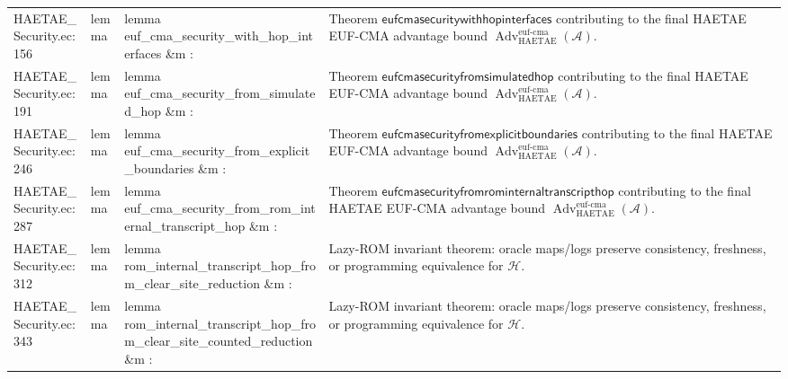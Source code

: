 \documentclass[10pt]{article}
\newcommand{\Adv}{\operatorname{Adv}}
\begin{document}
\begin{longtable}{L{0.11\textwidth}L{0.055\textwidth}L{0.385\textwidth}L{0.41\textwidth}}
HAETAE\_\allowbreak{}Security.\allowbreak{}ec:\allowbreak{}156 & lemma & {\ttfamily\scriptsize lemma euf\_\allowbreak{}cma\_\allowbreak{}security\_\allowbreak{}with\_\allowbreak{}hop\_\allowbreak{}interfaces \&m :} & Theorem $\mathsf{eufcmasecuritywithhopinterfaces}$ contributing to the final HAETAE EUF-CMA advantage bound $\Adv_{\mathrm{HAETAE}}^{\mathrm{euf\mbox{-}cma}}(\mathcal A)$. \\
HAETAE\_\allowbreak{}Security.\allowbreak{}ec:\allowbreak{}191 & lemma & {\ttfamily\scriptsize lemma euf\_\allowbreak{}cma\_\allowbreak{}security\_\allowbreak{}from\_\allowbreak{}simulated\_\allowbreak{}hop \&m :} & Theorem $\mathsf{eufcmasecurityfromsimulatedhop}$ contributing to the final HAETAE EUF-CMA advantage bound $\Adv_{\mathrm{HAETAE}}^{\mathrm{euf\mbox{-}cma}}(\mathcal A)$. \\
HAETAE\_\allowbreak{}Security.\allowbreak{}ec:\allowbreak{}246 & lemma & {\ttfamily\scriptsize lemma euf\_\allowbreak{}cma\_\allowbreak{}security\_\allowbreak{}from\_\allowbreak{}explicit\_\allowbreak{}boundaries \&m :} & Theorem $\mathsf{eufcmasecurityfromexplicitboundaries}$ contributing to the final HAETAE EUF-CMA advantage bound $\Adv_{\mathrm{HAETAE}}^{\mathrm{euf\mbox{-}cma}}(\mathcal A)$. \\
HAETAE\_\allowbreak{}Security.\allowbreak{}ec:\allowbreak{}287 & lemma & {\ttfamily\scriptsize lemma euf\_\allowbreak{}cma\_\allowbreak{}security\_\allowbreak{}from\_\allowbreak{}rom\_\allowbreak{}internal\_\allowbreak{}transcript\_\allowbreak{}hop \&m :} & Theorem $\mathsf{eufcmasecurityfromrominternaltranscripthop}$ contributing to the final HAETAE EUF-CMA advantage bound $\Adv_{\mathrm{HAETAE}}^{\mathrm{euf\mbox{-}cma}}(\mathcal A)$. \\
HAETAE\_\allowbreak{}Security.\allowbreak{}ec:\allowbreak{}312 & lemma & {\ttfamily\scriptsize lemma rom\_\allowbreak{}internal\_\allowbreak{}transcript\_\allowbreak{}hop\_\allowbreak{}from\_\allowbreak{}clear\_\allowbreak{}site\_\allowbreak{}reduction \&m :} & Lazy-ROM invariant theorem: oracle maps/logs preserve consistency, freshness, or programming equivalence for $\mathcal H$. \\
HAETAE\_\allowbreak{}Security.\allowbreak{}ec:\allowbreak{}343 & lemma & {\ttfamily\scriptsize lemma rom\_\allowbreak{}internal\_\allowbreak{}transcript\_\allowbreak{}hop\_\allowbreak{}from\_\allowbreak{}clear\_\allowbreak{}site\_\allowbreak{}counted\_\allowbreak{}reduction \&m :} & Lazy-ROM invariant theorem: oracle maps/logs preserve consistency, freshness, or programming equivalence for $\mathcal H$. \\

\end{longtable}
\end{document}
